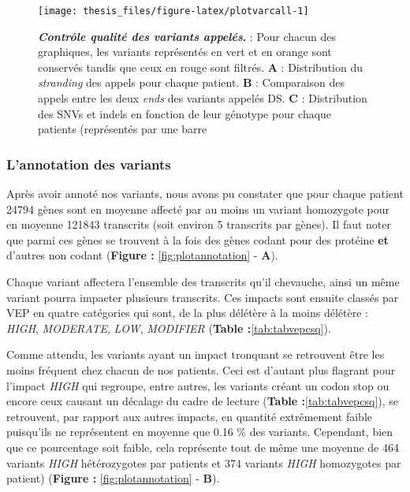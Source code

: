 \documentclass[12pt,twoside]{ugathesis}
\begin{document}
\newpage

\begin{figure}

{\centering \texttt{[image: thesis\_files/figure-latex/plotvarcall-1]} 

}

\caption[Contrôle qualité des variants appelés]{\textbf{\emph{Contrôle qualité des variants appelés}.}
: Pour chacun des graphiques, les variants représentés en vert et en
orange sont conservés tandis que ceux en rouge sont filtrés. \textbf{A}
: Distribution du \emph{stranding} des appels pour chaque patient.
\textbf{B} : Comparaison des appels entre les deux \emph{ends} des
variants appelés DS. \textbf{C} : Distribution des SNVs et indels en
fonction de leur génotype pour chaque patients (représentés par une
barre}\label{fig:plotvarcall}
\end{figure}










\newpage

\subsubsection{L'annotation des
variants}\label{lannotation-des-variants}

Après avoir annoté nos variants, nous avons pu constater que pour chaque
patient 24794 gènes sont en moyenne affecté par au moins un variant
homozygote pour en moyenne 121843 transcrits (soit environ 5 transcrits
par gènes). Il faut noter que parmi ces gènes se trouvent à la fois des
gènes codant pour des protéine \textbf{et} d'autres non codant
(\textbf{Figure : }\ref{fig:plotannotation} - \textbf{A}).

Chaque variant affectera l'ensemble des transcrits qu'il chevauche,
ainsi un même variant pourra impacter plusieurs transcrits. Ces impacts
sont ensuite classés par VEP en quatre catégories qui sont, de la plus
délétère à la moins délétère : \emph{HIGH}, \emph{MODERATE}, \emph{LOW},
\emph{MODIFIER} (\textbf{Table :}\ref{tab:tabvepcsq}).

Comme attendu, les variants ayant un impact tronquant se retrouvent être
les moins fréquent chez chacun de nos patients. Ceci est d'autant plus
flagrant pour l'impact \emph{HIGH} qui regroupe, entre autres, les
variants créant un codon stop ou encore ceux causant un décalage du
cadre de lecture (\textbf{Table :}\ref{tab:tabvepcsq}), se retrouvent,
par rapport aux autres impacts, en quantité extrêmement faible
puisqu'ils ne représentent en moyenne que 0.16 \% des variants.
Cependant, bien que ce pourcentage soit faible, cela représente tout de
même une moyenne de 464 variants \emph{HIGH} hétérozygotes par patients
et 374 variants \emph{HIGH} homozygotes par patient) (\textbf{Figure :
}\ref{fig:plotannotation} - \textbf{B}).
\end{document}
